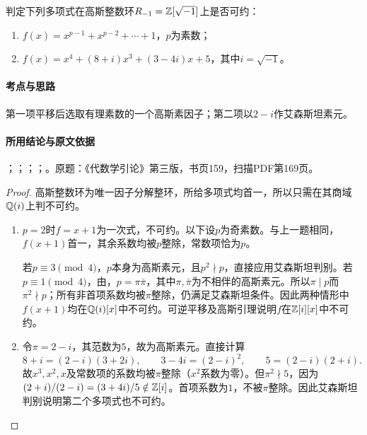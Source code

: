 判定下列多项式在高斯整数环$R_{-1}=\mathbb Z[\sqrt{-1}]$上是否可约：
\begin{enumerate}[label=(\roman*)]
\item $f(x)=x^{p-1}+x^{p-2}+\cdots+1$，$p$为素数；
\item $f(x)=x^4+(8+i)x^3+(3-4i)x+5$，其中$i=\sqrt{-1}$。
\end{enumerate}

\paragraph{考点与思路}

第一项平移后选取有理素数的一个高斯素因子；第二项以$2-i$作艾森斯坦素元。

\paragraph{所用结论与原文依据}

；；；；。原题：《代数学引论》第三版，书页159，扫描PDF第169页。


\begin{proof}

高斯整数环为唯一因子分解整环，所给多项式均首一，所以只需在其商域$\mathbb Q(i)$上判不可约。
\begin{enumerate}[label=(\roman*)]
\item $p=2$时$f=x+1$为一次式，不可约。以下设$p$为奇素数。与上一题相同，$f(x+1)$首一，其余系数均被$p$整除，常数项恰为$p$。

若$p\equiv3\pmod4$，$p$本身为高斯素元，且$p^2\nmid p$，直接应用艾森斯坦判别。若$p\equiv1\pmod4$，由，$p=\pi\bar\pi$，其中$\pi,\bar\pi$为不相伴的高斯素元。所以$\pi\mid p$而$\pi^2\nmid p$；所有非首项系数均被$\pi$整除，仍满足艾森斯坦条件。因此两种情形中$f(x+1)$均在$\mathbb Q(i)[x]$中不可约。可逆平移及高斯引理说明$f$在$\mathbb Z[i][x]$中不可约。
\item 令$\pi=2-i$，其范数为$5$，故为高斯素元。直接计算
\[
8+i=(2-i)(3+2i),\qquad
3-4i=(2-i)^2,\qquad 5=(2-i)(2+i).
\]
故$x^3,x^2,x$及常数项的系数均被$\pi$整除（$x^2$系数为零）。但$\pi^2\nmid5$，因为$(2+i)/(2-i)=(3+4i)/5\notin\mathbb Z[i]$。首项系数为$1$，不被$\pi$整除。因此艾森斯坦判别说明第二个多项式也不可约。
\end{enumerate}

\end{proof}

